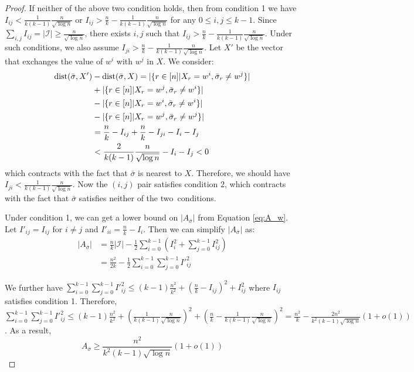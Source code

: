 \documentclass[entropy,article,accept,moreauthors,pdftex]{Definitions/mdpi}
\newcommand{\cI}{\mathcal{I}}
\newcommand{\1}{\mathbbm{1}}
\DeclareMathOperator{\Dist}{dist}
\begin{document}
\begin{paracol}{2}
\begin{proof}
	If neither of the above two condition holds, then from condition 1 we have\linebreak
	$I_{ij} < \frac{1}{k(k-1)}\frac{n}{\sqrt{\log n}}$ or $I_{ij} > \frac{n}{k} - \frac{1}{k(k-1)}\frac{n}{\sqrt{\log n}}$ for any $0 \leq i,j\leq k-1$.
	Since\linebreak $\sum_{i,j} I_{ij} = |\cI| \geq \frac{n}{\sqrt{\log n}}$, there exists $i,j$ such that $I_{ij} > \frac{n}{k} - \frac{1}{k(k-1)}\frac{n}{\sqrt{\log n}}$.
	Under such conditions, we also assume $I_{ji} > \frac{n}{k} - \frac{1}{k(k-1)}\frac{n}{\sqrt{\log n}}$.
	Let $X'$ be the vector that exchanges the value of $w^i$ with $w^j$ in $X$. We consider:
\begin{align}
	 \Dist(\bar{\sigma}, X') & - \Dist(\bar{\sigma}, X)= |\{ r \in [n]|X_r=w^i, \bar{\sigma}_r \neq w^j \}| \notag\\
	&+ |\{ r \in [n]|X_r=w^j, \bar{\sigma}_r \neq w^i \}| \notag\\
	&-|\{ r \in [n]|X_r=w^i, \bar{\sigma}_r \neq w^i \}| \notag\\
	&- |\{ r \in [n]|X_r=w^j, \bar{\sigma}_r \neq w^j \}| \notag\\
	& = \frac{n}{k} - I_{ij} +  \frac{n}{k} - I_{ji} - I_i - I_j\label{eq:distsmall} \\
	& < \frac{2}{k(k-1)}\frac{n}{\sqrt{\log n}} - I_i - I_j < 0\notag
	\end{align}
	which contracts with the fact that $\bar{\sigma}$ is nearest to $X$.
	Therefore, we should have $I_{ji} < \frac{1}{k(k-1)}\frac{n}{\sqrt{\log n}}$.
	Now the $(i, j)$ pair satisfies condition 2, which contracts with the fact that $\bar{\sigma}$ satisfies neither of the two~conditions.
	
	Under condition 1, we can get a lower bound on $|A_{\bar{\sigma}}|$ from Equation \eqref{eq:A_w}. Let $I'_{ij} = I_{ij}$ for $i\neq j$ and
	$I'_{ii} = \frac{n}{k} - I_i$. Then we can simplify $|A_{\bar{\sigma}}|$ as:
	\begin{align*}
	|A_{\bar{\sigma}}| &= \frac{n}{k}|\cI| - \frac{1}{2}\sum_{i=0}^{k-1}  (I^2_i + \sum_{j=0}^{k-1} I^2_{ij}) \\
	&= \frac{n^2}{2k} - \frac{1}{2} \sum_{i=0}^{k-1} \sum_{j=0}^{k-1} I'^2_{ij}
	\end{align*}
	
	We further have $\sum_{i=0}^{k-1} \sum_{j=0}^{k-1} I'^2_{ij} \leq (k-1)\frac{n^2}{k^2} + (\frac{n}{k} - I_{ij})^2 + I^2_{ij}$ where
	$I_{ij}$ satisfies condition 1. Therefore, $\sum_{i=0}^{k-1} \sum_{j=0}^{k-1} I'^2_{ij} \leq (k-1)\frac{n^2}{k^2} + (\frac{1}{k(k-1)}\frac{n}{\sqrt{\log n}})^2
	+ (\frac{n}{k} - \frac{1}{k(k-1)}\frac{n}{\sqrt{\log n}})^2 = \frac{n^2}{k} - \frac{2n^2}{k^2 (k-1)\sqrt{\log n}}(1+o(1))$.
	As a result,
\begin{equation}\label{eq:Asigma}
	A_{\bar{\sigma}} \geq \frac{n^2}{k^2 (k-1)\sqrt{\log n}}(1+o(1))
	\end{equation}
	

\end{proof}
\end{paracol}
\end{document}
